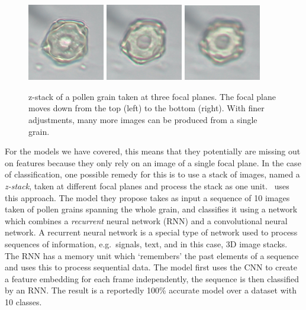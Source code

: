 \begin{figure}[htbp]
  \centering
  \includegraphics[width=0.3\textwidth]{figs/related/zstack/Snap-049.png}
  \hfill%
  \includegraphics[width=0.3\textwidth]{figs/related/zstack/Snap-050.png}
  \hfill%
  \includegraphics[width=0.3\textwidth]{figs/related/zstack/Snap-051.png}
  \caption[z-stack of pollen taken at three focal planes]{z-stack of a pollen grain taken at three focal planes. The focal plane moves down from the top (left) to the bottom (right). With finer adjustments, many more images can be produced from a single grain.}\label{fig:related-zstack}
\end{figure}

For the models we have covered, this means that they potentially are missing out on features because they only rely on an image of a single focal plane.
In the case of classification, one possible remedy for this is to use a stack of images, named a \textit{z-stack}, taken at different focal planes and process the stack as one unit.\ \textcite{DaoodAndRibeiro_2018} uses this approach.
The model they propose takes as input a sequence of 10 images taken of pollen grains spanning the whole grain, and classifies it using a network which combines a \textit{recurrent} neural network (RNN) and a convolutional neural network.
A recurrent neural network is a special type of network used to process sequences of information, e.g.\ signals, text, and in this case, 3D image stacks.
The RNN has a memory unit which `remembers' the past elements of a sequence and uses this to process sequential data.
The model first uses the CNN to create a feature embedding for each frame independently, the sequence is then classified by an RNN\@.
The result is a reportedly 100\% accurate model over a dataset with 10 classes.


